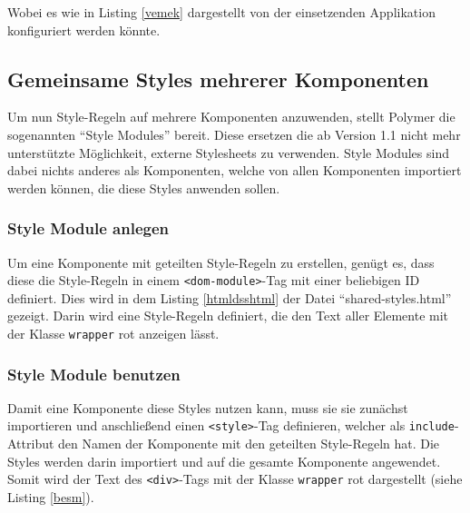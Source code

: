 

Wobei es wie in Listing \ref{vemek} dargestellt von der einsetzenden Applikation konfiguriert werden könnte.




\subsection{Gemeinsame Styles mehrerer Komponenten}\label{gemeinsame-styles-mehrerer-komponenten}

Um nun Style-Regeln auf mehrere Komponenten anzuwenden, stellt Polymer die sogenannten ``Style Modules'' bereit. Diese ersetzen die ab Version 1.1 nicht mehr \mbox{unterstützte} Möglichkeit, externe Stylesheets zu verwenden. Style Modules sind dabei nichts anderes als Komponenten, welche von allen Komponenten importiert werden können, die diese Styles anwenden sollen.


\subsubsection{Style Module anlegen}

Um eine Komponente mit geteilten Style-Regeln zu erstellen, genügt es, dass diese die Style-Regeln in einem \texttt{\textless{}dom-module\textgreater{}}-Tag mit einer beliebigen ID definiert. Dies wird in dem Listing \ref{htmldsshtml} der Datei ``shared-styles.html'' gezeigt. Darin wird eine Style-Regeln definiert, die den Text aller Elemente mit der Klasse \texttt{wrapper} rot anzeigen lässt.




\subsubsection{Style Module benutzen}

Damit eine Komponente diese Styles nutzen kann, muss sie sie zunächst importieren und anschließend einen \texttt{\textless{}style\textgreater{}}-Tag definieren, welcher als \texttt{include}-Attribut den Namen der Komponente mit den geteilten Style-Regeln hat. Die Styles werden darin importiert und auf die gesamte Komponente angewendet. Somit wird der Text des \texttt{\textless{}div\textgreater{}}-Tags mit der Klasse \texttt{wrapper} rot dargestellt (siehe Listing \ref{besm}).

